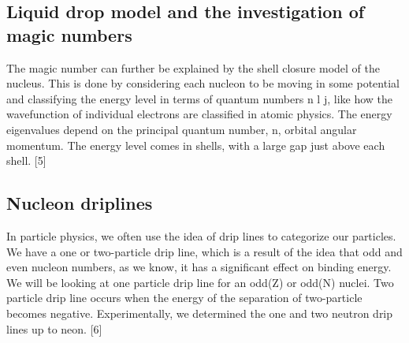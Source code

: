 \subsection{Liquid drop model and the investigation of magic numbers}
The magic number can further be explained by the shell closure model of the nucleus.
This is done by considering each nucleon to be moving in some potential and classifying the energy level in terms of quantum numbers n l j, like how the wavefunction of individual electrons are classified in atomic physics.
The energy eigenvalues depend on the principal quantum number, n, orbital angular momentum.
The energy level comes in shells, with a large gap just above each shell. [5]

\subsection{Nucleon driplines}
In particle physics, we often use the idea of drip lines to categorize our particles.
We have a one or two-particle drip line, which is a result of the idea that odd and even nucleon numbers, as we know, it has a significant effect on binding energy.
We will be looking at one particle drip line for an odd(Z) or odd(N) nuclei.
Two particle drip line occurs when the energy of the separation of two-particle becomes negative.
Experimentally, we determined the one and two neutron drip lines up to neon. [6]
